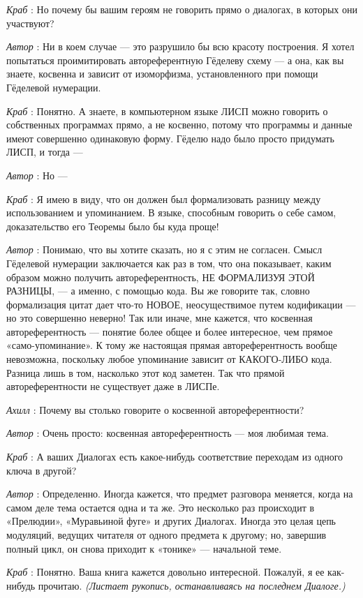 \documentclass[../main.tex]{subfiles}
\begin{document}
\begin{dialogue}
\emph{Краб} : Но почему бы вашим героям не говорить прямо о диалогах, в которых они участвуют?

\emph{Автор} : Ни в коем случае --- это разрушило бы всю красоту построения. Я хотел попытаться проимитировать автореферентную Гёделеву схему --- а она, как вы знаете, косвенна и зависит от изоморфизма, установленного при помощи Гёделевой нумерации.

\emph{Краб} : Понятно. А знаете, в компьютерном языке ЛИСП можно говорить о собственных программах прямо, а не косвенно, потому что программы и данные имеют совершенно одинаковую форму. Гёделю надо было просто придумать ЛИСП, и тогда ---

\emph{Автор} : Но ---

\emph{Краб} : Я имею в виду, что он должен был формализовать разницу между использованием и упоминанием. В языке, способным говорить о себе самом, доказательство его Теоремы было бы куда проще!

\emph{Автор} : Понимаю, что вы хотите сказать, но я с этим не согласен. Смысл Гёделевой нумерации заключается как раз в том, что она показывает, каким образом можно получить автореферентность, НЕ ФОРМАЛИЗУЯ ЭТОЙ РАЗНИЦЫ, --- а именно, с помощью кода. Вы же говорите так, словно формализация цитат дает что-то НОВОЕ, неосуществимое путем кодификации --- но это совершенно неверно! Так или иначе, мне кажется, что косвенная автореферентность --- понятие более общее и более интересное, чем прямое «само-упоминание». К тому же настоящая прямая автореферентность вообще невозможна, поскольку любое упоминание зависит от КАКОГО-ЛИБО кода. Разница лишь в том, насколько этот код заметен. Так что прямой автореферентности не существует даже в ЛИСПе.

\emph{Ахилл} : Почему вы столько говорите о косвенной автореферентности?

\emph{Автор} : Очень просто: косвенная автореферентность --- моя любимая тема.

\emph{Краб} : А ваших Диалогах есть какое-нибудь соответствие переходам из одного ключа в другой?

\emph{Автор} : Определенно. Иногда кажется, что предмет разговора меняется, когда на самом деле тема остается одна и та же. Это несколько раз происходит в «Прелюдии», «Муравьиной фуге» и других Диалогах. Иногда это целая цепь модуляций, ведущих читателя от одного предмета к другому; но, завершив полный цикл, он снова приходит к «тонике» --- начальной теме.

\emph{Краб} : Понятно. Ваша книга кажется довольно интересной. Пожалуй, я ее как-нибудь прочитаю. \emph{(Листает рукопись, останавливаясь на последнем Диалоге.)}


\end{dialogue}
\end{document}
